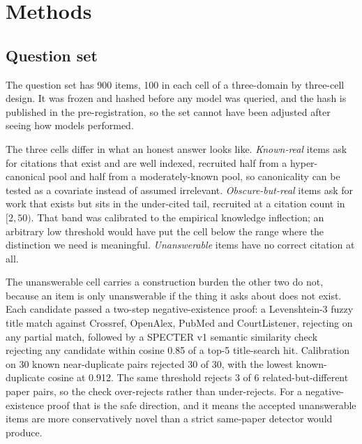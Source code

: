 
\section{Methods}
\label{sec:methods}

\subsection{Question set}

The question set has 900 items, 100 in each cell of a three-domain by
three-cell design. It was frozen and hashed before any model was queried, and
the hash is published in the pre-registration, so the set cannot have been
adjusted after seeing how models performed.

The three cells differ in what an honest answer looks like. \emph{Known-real}
items ask for citations that exist and are well indexed, recruited half from a
hyper-canonical pool and half from a moderately-known pool, so canonicality can
be tested as a covariate instead of assumed irrelevant. \emph{Obscure-but-real}
items ask for work that exists but sits in the under-cited tail, recruited at a
citation count in $[2, 50)$. That band was calibrated to the empirical knowledge
inflection; an arbitrary low threshold would have put the cell below the range
where the distinction we need is meaningful.
\emph{Unanswerable} items have no correct citation at all.

The unanswerable cell carries a construction burden the other two do not,
because an item is only unanswerable if the thing it asks about does not exist.
Each candidate passed a two-step negative-existence proof: a Levenshtein-3 fuzzy
title match against Crossref, OpenAlex, PubMed and CourtListener, rejecting on
any partial match, followed by a SPECTER v1 semantic similarity check rejecting
any candidate within cosine 0.85 of a top-5 title-search hit. Calibration on 30
known near-duplicate pairs rejected 30 of 30, with the lowest known-duplicate
cosine at 0.912. The same threshold rejects 3 of 6 related-but-different paper
pairs, so the check over-rejects rather than under-rejects. For a
negative-existence proof that is the safe direction, and it means the accepted
unanswerable items are more conservatively novel than a strict same-paper
detector would produce.

